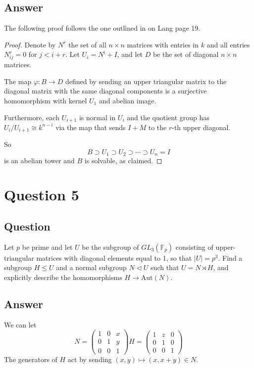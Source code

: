 \documentclass[11pt]{article}
\begin{document}
\subsection{Answer}

The following proof follows the one outlined in on Lang page 19.

\begin{proof}
Denote by $N^r$ the set of all $n \times n$ matrices with entries in $k$ and all entries $N^r_{ij}=0$ for $j<i+r$. Let $U_i=N^i+I$, and let $D$ be the set of diagonal $n \times n$ matrices.

The map $\varphi: B \to D$ defined by sending an upper triangular matrix to the diagonal matrix with the same diagonal components is a surjective homomorphism with kernel $U_1$ and abelian image.

Furthermore, each $U_{i+1}$ is normal in $U_{i}$ and the quotient group has $U_i / U_{i+1} \cong k^{n-i}$ via the map that sends $I+M$ to the $r$-th upper diagonal. 


So 
\[B \supset U_1\supset U_2 \supset \cdots \supset U_n = I\]
is an abelian tower and $B$ is solvable, as claimed.
\end{proof}
\section{Question 5}
\subsection{Question}
Let $p$ be prime and let $U$ be the subgroup of $GL_3(\mathbb{F}_p)$ consisting of upper-triangular matrices with diagonal elements equal to 1, so that $|U|=p^3$. Find a subgroup $H \leq U$ and a normal subgroup $N \lhd U$ such that $U = N \rtimes H$, and explicitly describe the homomorphisms $ H \to \mathrm{Aut}(N)$.
\subsection{Answer}
We can let 
\[ N = \left( \begin{array}{ccc} 1& 0& x \\ 0&1&y \\ 0&0&1 \end{array} \right)  H = \left( \begin{array}{ccc} 1& z& 0 \\ 0&1&0 \\ 0&0&1 \end{array} \right)\]
The generators of $H$ act by sending $(x,y) \mapsto (x,x+y) \in N$.
\end{document}
